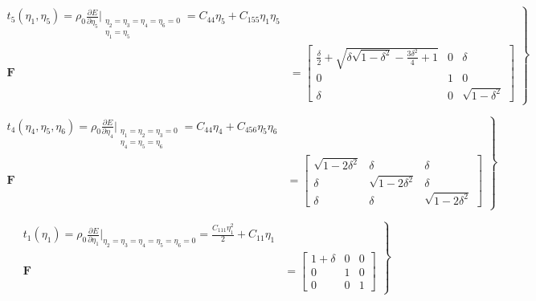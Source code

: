\documentclass[showpacs,aps,floatfix,prb,reprint,superscriptaddress,onecolumn]{revtex4-1}
\begin{document}
\begin{equation}
\label{eqn:SM-hexs6}
  \left.\begin{aligned}
        t_{5} \left(\eta_{1}, \eta_{5}\right) = \rho_{0} \frac{\partial E}{\partial \eta_{5}}\Bigr|_{\substack{\eta_2=\eta_3=\eta_4=\eta_6=0 \\ \eta_{1} = \eta_{5}}} = C_{44}\eta_{5} + C_{155}\eta_{1}\eta_{5} \\
        \bm{F}&=\begin{bmatrix} \frac{\delta}{2}+\sqrt{\delta \sqrt{1-\delta^2}-\frac{3 \delta^2}{4}+1} & 0 & \delta \\ 0 & 1 & 0 \\ \delta & 0 & \sqrt{1-\delta^2} \end{bmatrix}
       \end{aligned}
			\right\}
\end{equation}


\begin{equation}
\label{eqn:SM-hexs7}
  \left.\begin{aligned}
        t_{4} \left(\eta_{4}, \eta_{5}, \eta_{6} \right) = \rho_{0} \frac{\partial E}{\partial \eta_{4}}\Bigr|_{\substack{\eta_1=\eta_2=\eta_3=0 \\ \eta_{4}=\eta_{5}=\eta_{6}}} = C_{44} \eta_{4} + C_{456}\eta_{5}\eta_{6} \\
        \bm{F}&=\begin{bmatrix} \sqrt{1-2\delta^{2}} & \delta & \delta \\ \delta & \sqrt{1-2\delta^{2}} & \delta \\ \delta & \delta & \sqrt{1-2\delta^{2}} \end{bmatrix}
       \end{aligned}
			\right\}
\end{equation}







\begin{equation}
\label{eqn:SM-s1}
  \left.\begin{aligned}
        t_{1} \left(\eta_{1}\right) = \rho_{0} \frac{\partial E}{\partial \eta_{1}}\Bigr|_{\eta_2=\eta_3=\eta_4=\eta_5=\eta_6=0} = \frac{C_{111}\eta_{1}^2}{2} + C_{11}\eta_{1}\\
        \bm{F}&=\begin{bmatrix} 1+\delta & 0 & 0 \\ 0 & 1 & 0 \\ 0 & 0 & 1 \end{bmatrix}
       \end{aligned}
			\right\}
\end{equation}
\end{document}
